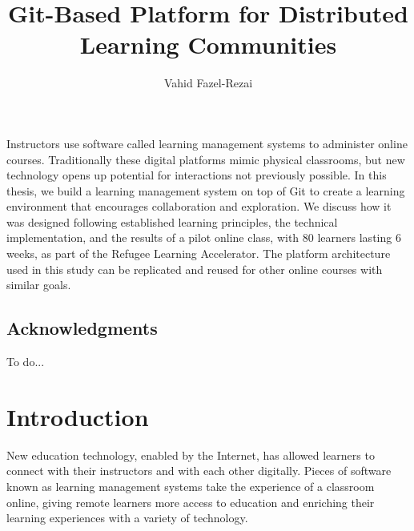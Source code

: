 \documentclass[12pt,twoside,vi]{mitthesis}
\newcommand{\wip}[1]{{\color{red} To do...}}
\begin{document}
\title{Git-Based Platform for Distributed Learning Communities}
\author{Vahid Fazel-Rezai}
\maketitle
\cleardoublepage
\setcounter{savepage}{\thepage}
\begin{abstractpage}
Instructors use software called learning management systems to administer online courses. Traditionally these digital platforms mimic physical classrooms, but new technology opens up potential for interactions not previously possible. In this thesis, we build a learning management system on top of Git to create a learning environment that encourages collaboration and exploration. We discuss how it was designed following established learning principles, the technical implementation, and the results of a pilot online class, with 80 learners lasting 6 weeks, as part of the Refugee Learning Accelerator. The platform architecture used in this study can be replicated and reused for other online courses with similar goals.
\end{abstractpage}
\cleardoublepage
\section*{Acknowledgments}
\wip{Acknowledgments...}

\tableofcontents

\newpage
\listoffigures


\chapter{Introduction}

New education technology, enabled by the Internet, has allowed learners to connect with their instructors and with each other digitally. Pieces of software known as learning management systems take the experience of a classroom online, giving remote learners more access to education and enriching their learning experiences with a variety of technology.
\end{document}
